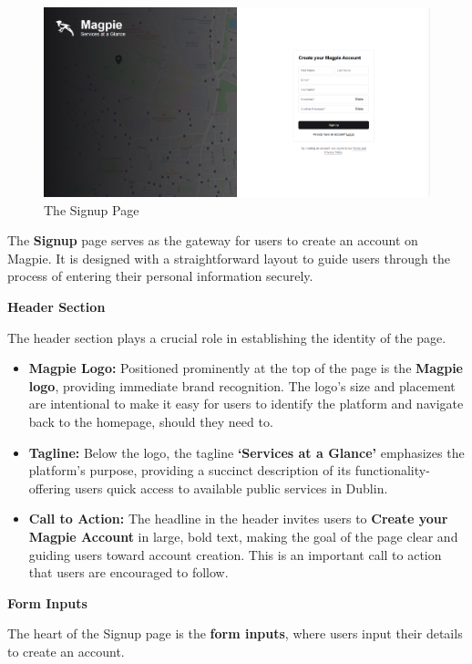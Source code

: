 \begin{figure}[h]
    \centering{}
    \includegraphics[width=1\textwidth]{images/site/signup/signup_page.png}
    \caption{The Signup Page}
\end{figure}

The \textbf{Signup} page serves as the gateway for users to create an account on Magpie. It is designed with a straightforward layout to guide users through the process of entering their personal information securely.

\textbf{Header Section}

The header section plays a crucial role in establishing the identity of the page.
\begin{itemize}
    \item{} \textbf{Magpie Logo:} Positioned prominently at the top of the page is the \textbf{Magpie logo}, providing immediate brand recognition. The logo’s size and placement are intentional to make it easy for users to identify the platform and navigate back to the homepage, should they need to.
    \item{} \textbf{Tagline:} Below the logo, the tagline \textbf{`Services at a Glance'} emphasizes the platform's purpose, providing a succinct description of its functionality{-}offering users quick access to available public services in Dublin.
    \item{} \textbf{Call to Action:} The headline in the header invites users to \textbf{Create your Magpie Account} in large, bold text, making the goal of the page clear and guiding users toward account creation. This is an important call to action that users are encouraged to follow.
\end{itemize}

\textbf{Form Inputs}

The heart of the Signup page is the \textbf{form inputs}, where users input their details to create an account.

